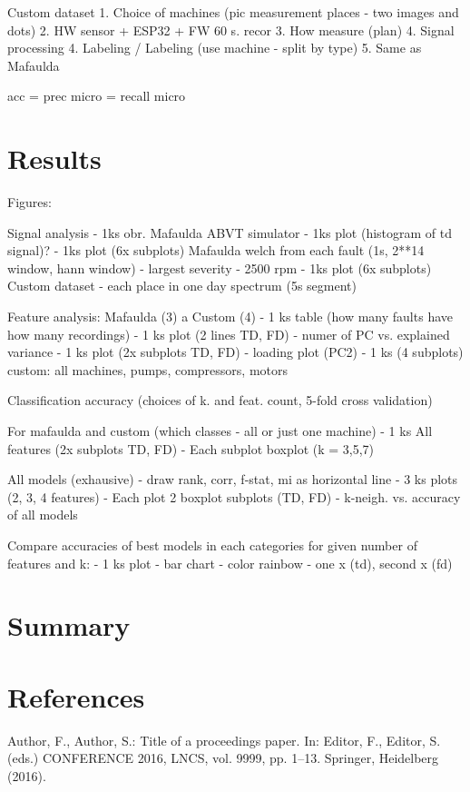 \documentclass{llncs}
\begin{document}
Custom dataset
1. Choice of machines (pic measurement places - two images and dots)
2. HW sensor + ESP32 + FW 60 s. recor
3. How measure (plan)
4. Signal processing
4. Labeling  / Labeling (use machine - split by type) 
5. Same as Mafaulda

acc = prec micro = recall micro



\section{Results}


Figures:

Signal analysis
- 1ks obr. Mafaulda ABVT simulator
- 1ks plot (histogram of td signal)?
- 1ks plot (6x subplots) Mafaulda welch from each fault (1s, 2**14 window, hann window)  - largest severity - 2500 rpm
- 1ks plot (6x subplots) Custom dataset - each place in one day spectrum (5s segment)

Feature analysis:
Mafaulda (3) a Custom (4) 
- 1 ks table (how many faults have how many recordings)
- 1 ks plot (2 lines TD, FD) - numer of PC vs. explained variance
- 1 ks plot (2x subplots TD, FD) - loading plot (PC2)
- 1 ks (4 subplots) custom: all machines, pumps, compressors, motors


Classification accuracy (choices of k. and feat. count, 5-fold cross validation)

For mafaulda and custom (which classes - all or just one machine)
- 1 ks All features (2x subplots TD, FD)
	- Each subplot boxplot (k = 3,5,7)

All models (exhausive) - draw rank, corr, f-stat, mi as horizontal line
	- 3 ks plots (2, 3, 4 features)
		- Each plot 2 boxplot subplots (TD, FD) - k-neigh. vs. accuracy of all models


Compare accuracies of best models in each categories for given number of features and k:
- 1 ks plot - bar chart - color rainbow - one x (td), second x (fd)



\section{Summary}

\section{References}






\begin{thebibliography}{1}

Author, F., Author, S.: Title of a proceedings paper. In: Editor,
F., Editor, S. (eds.) CONFERENCE 2016, LNCS, vol. 9999, pp. 1--13.
Springer, Heidelberg (2016). 

\end{thebibliography}
\end{document}
